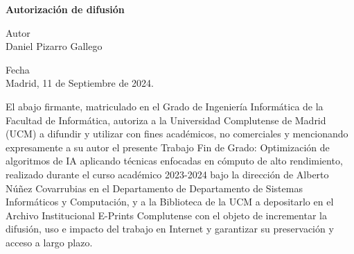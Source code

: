 
\newpage

\thispagestyle{empty}

\begin{center}

{\bf \Huge Autorización de difusión}

\vspace{1cm}


   \large Autor\\
   Daniel Pizarro Gallego

   \vspace{0.5cm}


   Fecha\\
   Madrid, 11 de Septiembre de 2024.

   \vspace{0.5cm}
   \end{center}
   
El abajo firmante, matriculado en el Grado de Ingeniería Informática de la Facultad de Informática, autoriza a la Universidad Complutense de Madrid (UCM) a difundir y utilizar con fines académicos, no comerciales y mencionando expresamente a su autor el presente Trabajo Fin de Grado: Optimización de algoritmos de IA aplicando técnicas enfocadas en cómputo de alto rendimiento, realizado durante el curso académico 2023-2024 bajo la dirección de Alberto Núñez Covarrubias en el Departamento de Departamento de Sistemas Informáticos y Computación, y a la Biblioteca de la UCM a depositarlo en el Archivo Institucional E-Prints Complutense con el objeto de incrementar la difusión, uso e impacto del trabajo en Internet y garantizar su preservación y acceso a largo plazo.

